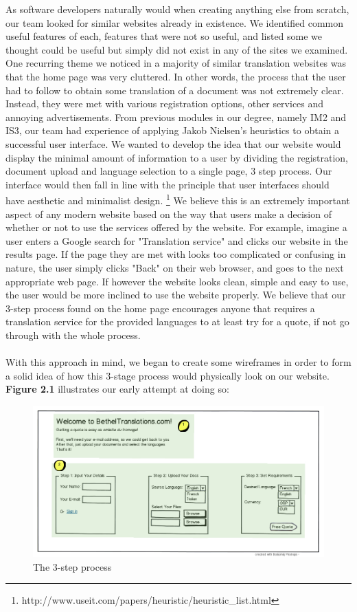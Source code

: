 \documentclass{l3proj}
\begin{document}
As software developers naturally would when creating anything else from scratch, our team looked for similar websites already in existence. We identified common useful features of each, features that were not so useful, and listed some we thought could be useful but simply did not exist in any of the sites we examined. One recurring theme we noticed in a majority of similar translation websites was that the home page was very cluttered. In other words, the process that the user had to follow to obtain some translation of a document was not extremely clear. Instead, they were met with various registration options, other services and annoying advertisements. From previous modules in our degree, namely IM2 and IS3, our team had experience of applying Jakob Nielsen's heuristics to obtain a successful user interface. We wanted to develop the idea that our website would display the minimal amount of information to a user by dividing the registration, document upload and language selection to a single page, 3 step process. Our interface would then fall in line with the principle that user interfaces should have aesthetic and minimalist design. \footnote{http://www.useit.com/papers/heuristic/heuristic\_list.html} We believe this is an extremely important aspect of any modern website based on the way that users make a decision of whether or not to use the services offered by the website. For example, imagine a user enters a Google search for "Translation service" and clicks our website in the results page. If the page they are met with looks too complicated or confusing in nature, the user simply clicks "Back" on their web browser, and goes to the next appropriate web page. If however the website looks clean, simple and easy to use, the user would be more inclined to use the website properly. We believe that our 3-step process found on the home page encourages anyone that requires a translation service for the provided languages to at least try for a quote, if not go through with the whole process.\\
\\
With this approach in mind, we began to create some wireframes in order to form a solid idea of how this 3-stage process would physically look on our website. \textbf{Figure 2.1} illustrates our early attempt at doing so:

\begin{figure}
\begin{center}
\includegraphics[width=\linewidth]{wireframes/bt-3step}
\caption{The 3-step process}
\end{center}
\end{figure}
\end{document}
